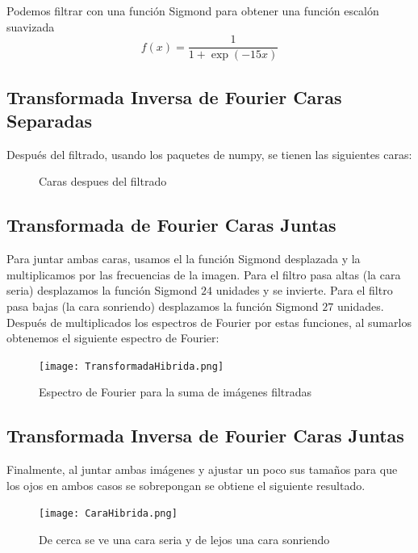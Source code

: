 \documentclass{article}
\begin{document}
Podemos filtrar con una función Sigmond para obtener una funci\'on escal\'on suavizada
\begin{equation*}
    f(x) = \frac{1}{1+ \exp(-15x)}
\end{equation*}

\subsection*{Transformada Inversa de Fourier Caras Separadas}
Despu\'es del filtrado, usando los paquetes de numpy, se tienen las siguientes caras:
\begin{figure}[!htbp]
  \centering
  \hspace{0.05cm}
  \caption{Caras despues del filtrado}
\end{figure}

\subsection*{Transformada de Fourier Caras Juntas}
Para juntar ambas caras, usamos el la funci\'on Sigmond desplazada y la multiplicamos por las frecuencias de la imagen. Para el filtro pasa altas (la cara seria) desplazamos la funci\'on Sigmond $24$ unidades y se invierte. Para el filtro pasa bajas (la cara sonriendo) desplazamos la funci\'on Sigmond $27$ unidades. Despu\'es de multiplicados los espectros de Fourier por estas funciones, al sumarlos obtenemos el siguiente espectro de Fourier:
\begin{figure}[!htbp]
 \centering
  \texttt{[image: TransformadaHibrida.png]}
  \caption{Espectro de Fourier para la suma de im\'agenes filtradas}
\end{figure}
\subsection*{Transformada Inversa de Fourier Caras Juntas}

Finalmente, al juntar ambas im\'agenes y ajustar un poco sus tama\~nos para que los ojos en ambos casos se sobrepongan se obtiene el siguiente resultado. 

\begin{figure}[!htbp]
 \centering
  \texttt{[image: CaraHibrida.png]}
  \caption{De cerca se ve una cara seria y de lejos una cara sonriendo}
\end{figure}
\end{document}
